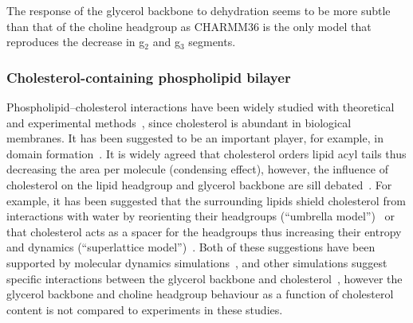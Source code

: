 \documentclass[pre,aps,floatfix,authordate1-4,twocolumn]{revtex4-1}
\begin{document}
The response of the glycerol backbone to dehydration seems to be more subtle than that of the choline headgroup 
as CHARMM36 is the only model that reproduces the decrease in g$_2$ and g$_3$ segments.


\subsubsection{Cholesterol-containing phospholipid bilayer}
Phospholipid--cholesterol interactions have been widely studied with theoretical~\cite{huang99,zhu07,rog09,alwarawrah12} and
experimental methods~\cite{brown78,marsh10,ferreira13,marsh13}, since cholesterol is abundant in biological membranes.
It has been suggested to be an important player, for example, in domain formation~\cite{simons04,somerharju09}.
It is widely agreed that cholesterol orders lipid acyl tails thus decreasing the area per molecule (condensing effect),
however, the influence of cholesterol on the lipid headgroup and glycerol backbone are sill debated~\cite{huang99,simons04,somerharju09}.
For example, it has been suggested that the surrounding lipids shield cholesterol from interactions with water by 
reorienting their headgroups (``umbrella model'')~\cite{huang99} or that cholesterol acts as a spacer for the headgroups thus increasing 
their entropy and dynamics (``superlattice model'')~\cite{somerharju09}. 
Both of these suggestions have been supported
by molecular dynamics simulations~\cite{zhu07,alwarawrah12}, and other simulations suggest specific
interactions between the glycerol backbone and cholesterol~\cite{rog09}, however the glycerol backbone and choline headgroup behaviour
as a function of cholesterol content is not compared to experiments in these studies. 
\end{document}
